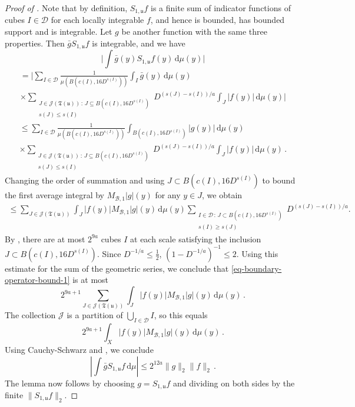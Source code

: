 \documentclass[10pt,a4paper]{article}
\theoremstyle{plain}
\theoremstyle{definition}
\numberwithin{equation}{subsection}
\newcommand{\fu}{{\mathfrak u}}
\newcommand{\fT}{{\mathfrak T}}
\newcommand{\proves}[1]{}
\newcommand{\leanok}{}
\begin{document}
\begin{proof}[Proof of ]
    \leanok
    \proves{boundary-operator-bound}
    Note that by definition, $S_{1,\fu}f$ is a finite sum of indicator functions of cubes $I \in \mathcal{D}$ for each locally integrable $f$, and hence is bounded, has bounded support and is integrable. Let $g$ be another function with the same three properties. Then $\bar g S_{1,\fu}f$ is integrable, and we have
    $$
        \Bigg|\int \bar g(y) S_{1,\fu}f(y) \, \mathrm{d}\mu(y)\Bigg|
    $$
    \begin{multline*}
        = \Bigg|\sum_{I\in\mathcal{D}} \frac{1}{\mu(B(c(I), 16 D^{s(I)}))} \int_I \bar g(y) \, \mathrm{d}\mu(y)\\
        \times \sum_{\substack{J\in \mathcal{J}(\fT(\fu))\,:\,J\subseteq B(c(I), 16 D^{s(I)})\\s(J)\le s(I)}} D^{(s(J)-s(I))/a}\int_J |f(y)| \,\mathrm{d}\mu(y)\Bigg|
    \end{multline*}
    \begin{multline*}
        \le \sum_{I\in\mathcal{D}} \frac{1}{\mu(B(c(I), 16D^{s(I)}))} \int_{B(c(I), 16D^{s(I)})} | g(y)| \, \mathrm{d}\mu(y)\\ \times \sum_{\substack{J\in \mathcal{J}(\fT(\fu))\,:\,J\subseteq B(c(I), 16 D^{s(I)})\\ s(J) \le s(I)}} D^{(s(J)-s(I))/a}\int_J |f(y)| \,\mathrm{d}\mu(y)\,.
    \end{multline*}
    Changing the order of summation and using $J \subset B(c(I), 16 D^{s(I)})$ to bound the first average integral by $M_{\mathcal{B},1}|g|(y)$ for any $y \in J$, we obtain
    \begin{align}
    \label{eq-boundary-operator-bound-1}
        \le \sum_{J\in\mathcal{J}(\fT(\fu))}\int_J|f(y)| M_{\mathcal{B},1}|g|(y) \, \mathrm{d}\mu(y) \sum_{\substack{I \in \mathcal{D} \, : \, J\subset B(c(I),16 D^{s(I)})\\ s(I) \ge s(J)}} D^{(s(J)-s(I))/a}.
    \end{align}
    By , there are at most $2^{9a}$ cubes $I$ at each scale satisfying the inclusion $J \subset B(c(I),16D^{s(I)})$.
    Since $D^{-1/a}\le\frac12$, $(1 - D^{-1/a})^{-1} \le 2$.
    Using this estimate for the sum of the geometric series, we conclude that \eqref{eq-boundary-operator-bound-1} is at most
    $$
        2^{9a+1} \sum_{J\in\mathcal{J}(\fT(\fu))}\int_J|f(y)| M_{\mathcal{B},1}|g|(y) \, \mathrm{d}\mu(y)\,.
    $$
    The collection $\mathcal{J}$ is a partition of $\bigcup_{I \in \mathcal{D}} I$, so this equals
    $$
        2^{9a+1} \int_X|f(y)| M_{\mathcal{B},1}|g|(y) \, \mathrm{d}\mu(y)\,.
    $$
    Using Cauchy-Schwarz and , we conclude
    $$
        \left|\int \bar g S_{1,\fu}f \, \mathrm{d}\mu \right| \le 2^{12a} \|g\|_2\|f\|_2\,.
    $$
    The lemma now follows by choosing $g = S_{1,\fu}f$ and dividing on both sides by the finite $\|S_{1,\fu}f\|_2$.
\end{proof}
\end{document}
